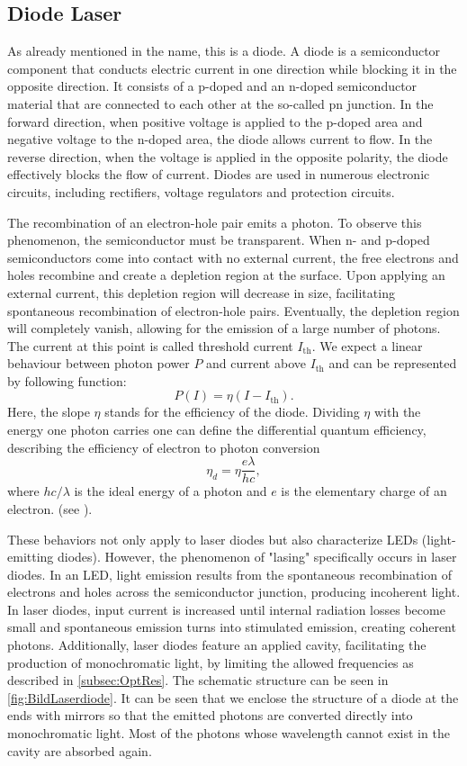 \subsection{Diode Laser}\label{subsec:diode}
As already mentioned in the name, this is a diode. A diode is a semiconductor component that conducts electric current in one direction while blocking it in the opposite direction. It consists of a p-doped and an n-doped semiconductor material that are connected to each other at the so-called pn junction. In the forward direction, when positive voltage is applied to the p-doped area and negative voltage to the n-doped area, the diode allows current to flow. In the reverse direction, when the voltage is applied in the opposite polarity, the diode effectively blocks the flow of current. Diodes are used in numerous electronic circuits, including rectifiers, voltage regulators and protection circuits. 

The recombination of an electron-hole pair emits a photon. To observe this phenomenon, the semiconductor must be transparent. When n- and p-doped semiconductors come into contact with no external current, the free electrons and holes recombine and create a depletion region at the surface. Upon applying an external current, this depletion region will decrease in size, facilitating spontaneous recombination of electron-hole pairs. Eventually, the depletion region will completely vanish, allowing for the emission of a large number of photons. The current at this point is called threshold current $I_\mathrm{th}$. We expect a linear behaviour between photon power $P$ and current above $I_\mathrm{th}$ and can be represented by following function:
\begin{equation}\label{eqn:Ith}
	P(I) = \eta \left(I - I_\mathrm{th} \right).
\end{equation}
Here, the slope $\eta$ stands for the efficiency of the diode. Dividing $\eta$ with the energy one photon carries one can define the differential quantum efficiency, describing the efficiency of electron to photon conversion
$$\eta_d=\eta\frac{e\lambda}{hc},$$
where $hc/\lambda$ is the ideal energy of a photon and $e$ is the elementary charge of an electron. (see \autocite{diodenlaser}).

These behaviors not only apply to laser diodes but also characterize LEDs (light-emitting diodes). However, the phenomenon of "lasing" specifically occurs in laser diodes. In an LED, light emission results from the spontaneous recombination of electrons and holes across the semiconductor junction, producing incoherent light. In laser diodes, input current is increased until internal radiation losses become small and spontaneous emission turns into stimulated emission, creating coherent photons. Additionally, laser diodes feature an applied cavity, facilitating the production of monochromatic light, by limiting the allowed frequencies as described in \autoref{subsec:OptRes}. The schematic structure can be seen in \autoref{fig:BildLaserdiode}. It can be seen that we enclose the structure of a diode at the ends with mirrors so that the emitted photons are converted directly into monochromatic light. Most of the photons whose wavelength cannot exist in the cavity are absorbed again.


